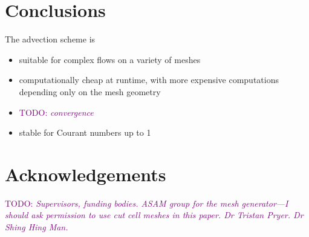 \documentclass[times]{elsarticle}
\newcommand{\TODO}[1]{\textcolor{purple}{TODO: \emph{#1}}}
\begin{document}




\section{Conclusions}

The advection scheme is
\begin{itemize}
	\item suitable for complex flows on a variety of meshes
	\item computationally cheap at runtime, with more expensive computations depending only on the mesh geometry
	\item \TODO{convergence}
	\item stable for Courant numbers up to 1
\end{itemize}

\section{Acknowledgements}
\TODO{Supervisors, funding bodies.  ASAM group for the mesh generator---I should ask permission to use cut cell meshes in this paper.  Dr Tristan Pryer.  Dr Shing Hing Man.}





\end{document}
